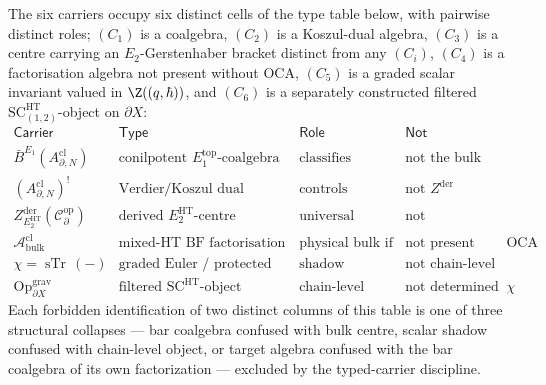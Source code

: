 \begin{prop}\label{prop:carrier-type-table}
The six carriers occupy six distinct cells of the type table below,
with pairwise distinct roles; \((C_1)\) is a coalgebra,
\((C_2)\) is a Koszul-dual algebra, \((C_3)\) is a centre carrying an
\(E_2\)-Gerstenhaber bracket distinct from any \((C_i)\),
\((C_4)\) is a factorisation algebra not present without \(\mathrm{OCA}\),
\((C_5)\) is a graded scalar invariant valued in
\(\Z((q,\hbar))\), and \((C_6)\) is a separately constructed filtered
\(\mathrm{SC}^{\mathrm{HT}}_{(1,2)}\)-object on \(\partial X\):
\[
  \renewcommand{\arraystretch}{1.25}
  \begin{array}{l|l|l|l}
    \mathsf{Carrier} & \mathsf{Type} & \mathsf{Role} & \mathsf{Not}\\\hline
    \bar B^{E_1}(A^{\mathrm{cl}}_{\partial,N}) &
      \text{conilpotent }E_1^{\mathrm{top}}\text{-coalgebra} &
      \text{classifies twisting morphisms} &
      \text{not the bulk}\\
    (A^{\mathrm{cl}}_{\partial,N})^! &
      \text{Verdier/Koszul dual algebra} &
      \text{controls line/open dual modules} &
      \text{not }Z^{\mathrm{der}}\\
    Z^{\mathrm{der}}_{E_2^{\mathrm{HT}}}(\mathcal C^{\mathrm{op}}_\partial) &
      \text{derived }E_2^{\mathrm{HT}}\text{-centre} &
      \text{universal closed sector} &
      \text{not automatically physical}\\
    \mathcal A^{\mathrm{cl}}_{\mathrm{bulk}} &
      \text{mixed-HT BF factorisation algebra} &
      \text{physical bulk if realised} &
      \text{not present without }\mathrm{OCA}\\
    \chi=\operatorname{sTr}\,(-) &
      \text{graded Euler / protected index} &
      \text{shadow invariant} &
      \text{not chain-level structure}\\
    \mathrm{Op}^{\mathrm{grav}}_{\partial X} &
      \text{filtered }\mathrm{SC}^{\mathrm{HT}}\text{-object} &
      \text{chain-level physical target} &
      \text{not determined by }\chi
  \end{array}
\]
Each forbidden identification of two distinct columns of this table
is one of three structural collapses --- bar coalgebra confused with
bulk centre, scalar shadow confused with chain-level object, or
target algebra confused with the bar coalgebra of its own factorization
--- excluded by the typed-carrier discipline.
\end{prop}

